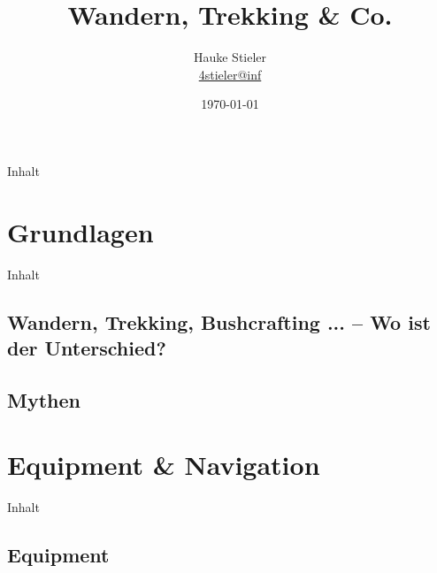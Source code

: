 \documentclass{beamer}
\author[Hauke Stieler]{Hauke Stieler\\\href{mailto:4stieler@informatik.uni-hamburg.de}{4stieler@inf}}
\title{Wandern, Trekking \& Co.}
\date{\today}
\begin{document}
	{
		\maketitle
		\addtocounter{page}{-1}
	}
	
	\begin{frame}[t]{Inhalt}
	\tableofcontents[hidesubsections]
	\end{frame}
	
	\section{Grundlagen}
		
		\begin{frame}[t]{Inhalt}
		\end{frame}
	
		\subsection{Wandern, Trekking, Bushcrafting ... -- Wo ist der Unterschied?}
		
			\begin{frame}{}
			\end{frame}
		
		\subsection{Mythen}
			
			\begin{frame}{}
			\end{frame}
		
	\section{Equipment \& Navigation}
		
		\begin{frame}[t]{Inhalt}
		\end{frame}
		
		\subsection{Equipment}
			
			\begin{frame}{}
			\end{frame}
		
\end{document}
